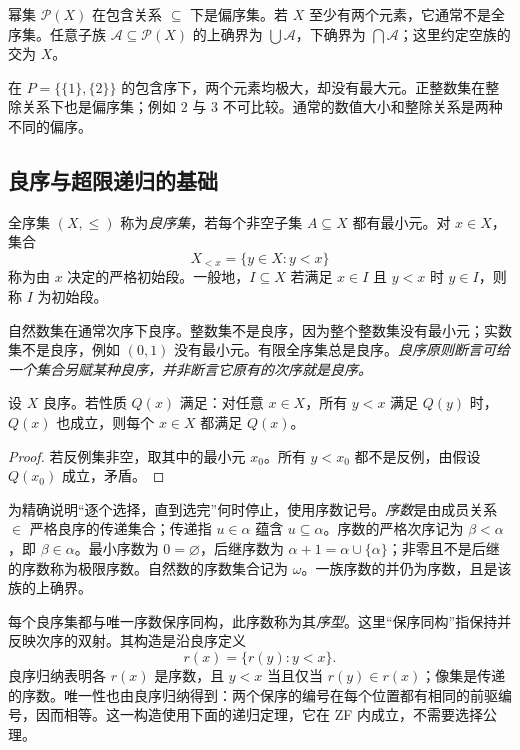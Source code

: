 \begin{example}[包含序与整除序]
幂集 $\mathcal P(X)$ 在包含关系 $\subseteq$ 下是偏序集。若 $X$ 至少有两个元素，它通常不是全序集。任意子族 $\mathcal A\subseteq\mathcal P(X)$ 的上确界为 $\bigcup\mathcal A$，下确界为 $\bigcap\mathcal A$；这里约定空族的交为 $X$。

在 $P=\{\{1\},\{2\}\}$ 的包含序下，两个元素均极大，却没有最大元。正整数集在整除关系下也是偏序集；例如 $2$ 与 $3$ 不可比较。通常的数值大小和整除关系是两种不同的偏序。
\end{example}

\subsection{良序与超限递归的基础}
\begin{definition}[良序与初始段]\label{def:y0-well-order}
全序集 $(X,\le)$ 称为\emph{良序集}，若每个非空子集 $A\subseteq X$ 都有最小元。对 $x\in X$，集合
\[
 X_{<x}=\{y\in X:y<x\}
\]
称为由 $x$ 决定的严格初始段。一般地，$I\subseteq X$ 若满足 $x\in I$ 且 $y<x$ 时 $y\in I$，则称 $I$ 为初始段。
\end{definition}

自然数集在通常次序下良序。整数集不是良序，因为整个整数集没有最小元；实数集不是良序，例如 $(0,1)$ 没有最小元。有限全序集总是良序。\emph{良序原则断言可给一个集合另赋某种良序，并非断言它原有的次序就是良序。}

\begin{proposition}[良序归纳]\label{prop:y0-well-order-induction}
设 $X$ 良序。若性质 $Q(x)$ 满足：对任意 $x\in X$，所有 $y<x$ 满足 $Q(y)$ 时，$Q(x)$ 也成立，则每个 $x\in X$ 都满足 $Q(x)$。
\end{proposition}
\begin{proof}
若反例集非空，取其中的最小元 $x_0$。所有 $y<x_0$ 都不是反例，由假设 $Q(x_0)$ 成立，矛盾。
\end{proof}

为精确说明“逐个选择，直到选完”何时停止，使用序数记号。\emph{序数}是由成员关系 $\in$ 严格良序的传递集合；传递指 $u\in\alpha$ 蕴含 $u\subseteq\alpha$。序数的严格次序记为 $\beta<\alpha$，即 $\beta\in\alpha$。最小序数为 $0=\varnothing$，后继序数为 $\alpha+1=\alpha\cup\{\alpha\}$；非零且不是后继的序数称为极限序数。自然数的序数集合记为 $\omega$。一族序数的并仍为序数，且是该族的上确界。

每个良序集都与唯一序数保序同构，此序数称为其\emph{序型}。这里“保序同构”指保持并反映次序的双射。其构造是沿良序定义
\[
 r(x)=\{r(y):y<x\}.
\]
良序归纳表明各 $r(x)$ 是序数，且 $y<x$ 当且仅当 $r(y)\in r(x)$；像集是传递的序数。唯一性也由良序归纳得到：两个保序的编号在每个位置都有相同的前驱编号，因而相等。这一构造使用下面的递归定理，它在 ZF 内成立，不需要选择公理。

